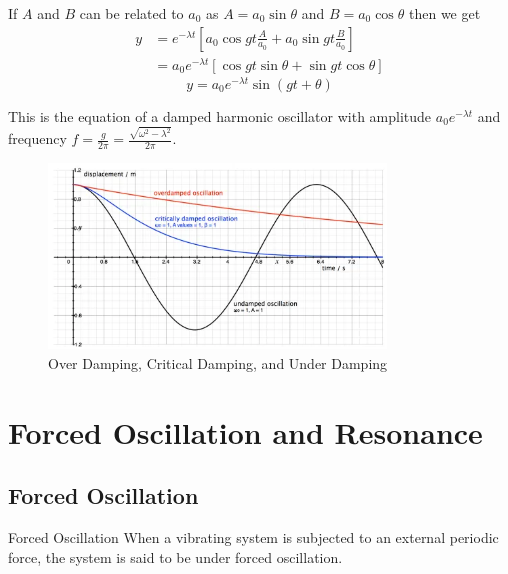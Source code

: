 \documentclass[12pt]{article}
\numberwithin{equation}{subsection}
\begin{document}
If $A$ and $B$ can be related to $a_0$ as $A = a_0\sin{\theta}$ and $B = a_0\cos{\theta}$ then we get
\begin{align*}
    y &= e^{-\lambda t} \left[ a_0\cos{gt}\frac{A}{a_0} + a_0\sin{gt}\frac{B}{a_0} \right] \\
    &= a_0 e^{-\lambda t} \left[ \cos{gt}\sin{\theta} + \sin{gt}\cos{\theta} \right]
\end{align*}
\begin{equation}
    \boxed{ y = a_0 e^{-\lambda t} \sin{(gt+\theta)} }
\end{equation}

This is the equation of a damped harmonic oscillator with amplitude $a_0e^{-\lambda t}$ and frequency $\displaystyle f = \frac{g}{2\pi} = \frac{\sqrt{\omega^2-\lambda^2}}{2\pi}$.

\begin{figure}[htpb]
    \centering
    \includegraphics[width=0.8\textwidth]{Damping.png}
    \caption{Over Damping, Critical Damping, and Under Damping}
    \label{fig:Damping-png}
\end{figure}


\section{Forced Oscillation and Resonance}
\subsection{Forced Oscillation}
\begin{definition}{Forced Oscillation}{}
    When a vibrating system is subjected to an external periodic force, the system is said to be under forced oscillation.
\end{definition}
\end{document}
